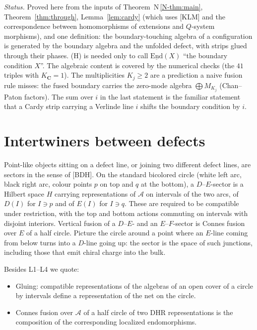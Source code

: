 \documentclass[11pt]{article}
\theoremstyle{definition}
\theoremstyle{remark}
\newcommand{\cA}{\mathcal A}
\newcommand{\bfC}{\mathbf C}
\newcommand{\nref}[1]{N\,\ref{N-#1}}
\begin{document}
\emph{Status.} Proved here from the inputs of Theorem~\nref{thm:main}, Theorem~\ref{thm:through}, Lemma~\ref{lem:cardy} (which uses [KLM] and the correspondence between homomorphisms of extensions and $Q$-system morphisms), and one definition: the boundary-touching algebra of a configuration is generated by the boundary algebra and the unfolded defect, with strips glued through their phases. (H) is needed only to call $\underline{\mathrm{End}}(X)$ ``the boundary condition $X$''. The algebraic content is covered by the numerical checks (the $41$ triples with $K_{\bfC}=1$). The multiplicities $K_j\ge2$ are a prediction a naive fusion rule misses: the fused boundary carries the zero-mode algebra $\bigoplus M_{K_j}$ (Chan--Paton factors). The sum over $i$ in the last statement is the familiar statement that a Cardy strip carrying a Verlinde line $i$ shifts the boundary condition by $i$.

\section{Intertwiners between defects}\label{sec:sectors}
Point-like objects sitting on a defect line, or joining two different defect lines, are sectors in the sense of [BDH]. On the standard bicolored circle (white left arc, black right arc, colour points $p$ on top and $q$ at the bottom), a $D$--$E$-sector is a Hilbert space $H$ carrying representations of $\cA$ on intervals of the two arcs, of $D(I)$ for $I\ni p$ and of $E(I)$ for $I\ni q$. These are required to be compatible under restriction, with the top and bottom actions commuting on intervals with disjoint interiors. Vertical fusion of a $D$--$E$- and an $E$--$F$-sector is Connes fusion over $E$ of a half circle. Picture the circle around a point where an $E$-line coming from below turns into a $D$-line going up: the sector is the space of such junctions, including those that emit chiral charge into the bulk.

Besides L1--L4 we quote:
\begin{itemize}[leftmargin=2.6em]
\item[(L5)] [BDH] Gluing: compatible representations of the algebras of an open cover of a circle by intervals define a representation of the net on the circle.
\item[(L6)] Connes fusion over $\cA$ of a half circle of two DHR representations is the composition of the corresponding localized endomorphisms.
\end{itemize}
\end{document}
